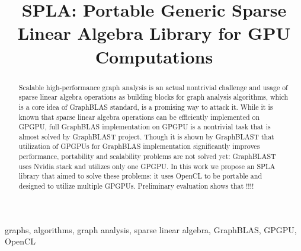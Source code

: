 \documentclass[conference]{IEEEtran}
\begin{document}
\title{SPLA: Portable Generic Sparse Linear Algebra Library for GPU Computations\\
}

\author{
\and
{}
\and
{}
}

\maketitle

\begin{abstract}
    Scalable high-performance graph analysis is an actual nontrivial challenge and usage of sparse linear algebra operations as building blocks for graph analysis algorithms, which is a core idea of GraphBLAS standard, is a promising way to attack it.
    While it is known that sparse linear algebra operations can be efficiently implemented on GPGPU, full GraphBLAS implementation on GPGPU is a nontrivial task that is almost solved by GraphBLAST project. Though it is shown by GraphBLAST that utilization of GPGPUs for GraphBLAS implementation significantly improves performance, portability and scalability problems are not solved yet: GraphBLAST uses Nvidia stack and utilizes only one GPGPU.
    In this work we propose an SPLA library that aimed to solve these problems: it uses OpenCL to be portable and designed to utilize multiple GPGPUs.
    Preliminary evaluation shows that !!!!
\end{abstract}

\begin{IEEEkeywords}
graphs, algorithms, graph analysis, sparse linear algebra, GraphBLAS, GPGPU, OpenCL
\end{IEEEkeywords}








\end{document}
